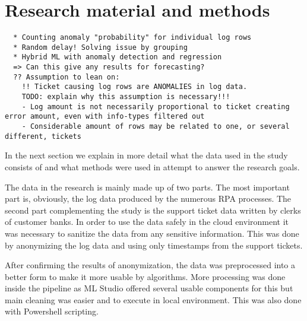 

\section{Research material and methods}\label{sec:research-material-and-methods}

\begin{verbatim}
  * Counting anomaly "probability" for individual log rows
  * Random delay! Solving issue by grouping
  * Hybrid ML with anomaly detection and regression
  => Can this give any results for forecasting?
  ?? Assumption to lean on:
    !! Ticket causing log rows are ANOMALIES in log data.
    TODO: explain why this assumption is necessary!!!
    - Log amount is not necessarily proportional to ticket creating error amount, even with info-types filtered out
    - Considerable amount of rows may be related to one, or several different, tickets
\end{verbatim}

In the next section
we explain in more detail
what the data used in the study
consists of
and what methods were used
in attempt to answer the research goals.

The data in the research is mainly made up of two parts.
The most important part is, obviously,
the log data produced by the numerous RPA processes.
The second part complementing the study
is the support ticket data written by clerks of customer banks.
In order to use the data safely in the cloud environment
it was necessary to sanitize the data
from any sensitive information.
This was done by anonymizing the log data
and using only timestamps from the support tickets.

After confirming the results of anonymization,
the data was preprocessed into a better form
to make it more usable by algorithms.
More processing was done inside the pipeline
as ML Studio offered several usable components for this
but main cleaning was easier and to execute in local environment.
This was also done with Powershell scripting.

